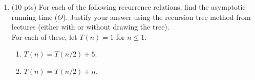 \documentclass[14pt]{extarticle}
\newcommand\tab[1][1cm]{\hspace*{#1}}
\begin{document}
\begin{enumerate}
\begin{enumerate}

\end{enumerate}


\item (10 pts) For each of the following recurrence relations, find the asymptotic running time ($\Theta$). Justify your answer using the recursion tree method from lectures (either with or without drawing the tree).
\\ For each of these, let $T(n) = 1$ for $n \leq 1$.
\begin{enumerate}
\item $T(n) = T(n/2) + 5$.
\item $T(n) = T(n/2) + n$.
\end{enumerate}



\end{enumerate}
\end{document}
